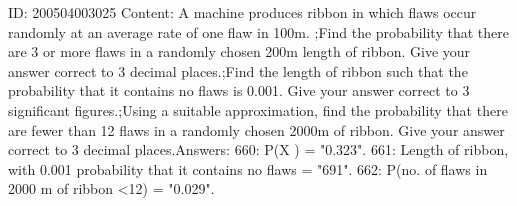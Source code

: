 \documentclass{article}
\begin{document}
ID: 200504003025
Content:
A machine produces ribbon in which flaws occur randomly at an average rate of one flaw in 100m. ;Find the probability that there are 3 or more flaws in a randomly chosen 200m length of ribbon. Give your answer correct to 3 decimal places.;Find the length of ribbon such that the probability that it contains no flaws is 0.001. Give your answer correct to 3 significant figures.;Using a suitable approximation, find the probability that there are fewer than 12 flaws in a randomly chosen 2000m of ribbon. Give your answer correct to 3 decimal places.Answers:
660: P(X ) = "0.323".
661: Length of ribbon, with 0.001 probability that it contains no flaws = "691".
662: P(no. of flaws in 2000 m of ribbon <12) = "0.029".
\end{document}

